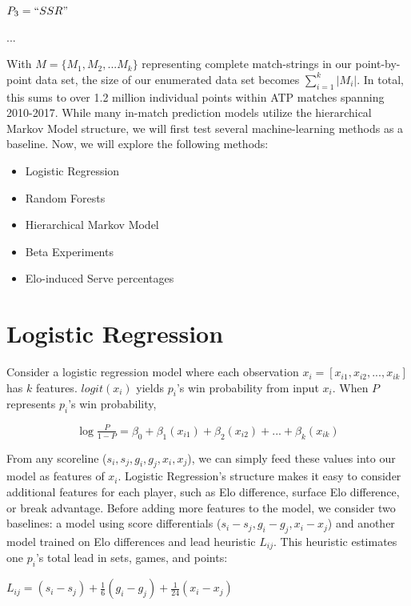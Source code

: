 \documentclass[chapterprefix=false]{report}
\begin{document}
$P_3 = ``SSR"$

...

With $M = \{M_1,M_2,...M_k\}$ representing complete match-strings in our point-by-point data set, the size of our enumerated data set becomes $\sum_{i=1}^k |M_i|$. In total, this sums to over 1.2 million individual points within ATP matches spanning 2010-2017. While many in-match prediction models utilize the hierarchical Markov Model structure, we will first test several machine-learning methods as a baseline. Now, we will explore the following methods:

\begin{itemize}
  \item Logistic Regression
  \item Random Forests
  \item Hierarchical Markov Model
  \item Beta Experiments 
  \item Elo-induced Serve percentages
\end{itemize}


\section{Logistic Regression}

Consider a logistic regression model where each observation $x_i = [x_{i1},x_{i2},...,x_{ik}]$ has $k$ features. $logit(x_i)$ yields $p_i$'s win probability from input $x_i$. When $P$ represents $p_i$'s win probability,

$$ \log{\tfrac{P}{1-P}} = \beta_0+\beta_1(x_{i1})+\beta_2(x_{i2})+...+\beta_k(x_{ik})$$


From any scoreline ($s_i,s_j,g_i,g_j,{x}_i,{x}_j$), we can simply feed these values into our model as features of $x_i$. Logistic Regression's structure makes it easy to consider additional features for each player, such as Elo difference, surface Elo difference, or break advantage. Before adding more features to the model, we consider two baselines: a model using score differentials ($s_i-s_j,g_i-g_j,{x}_i-{x}_j$) and another model trained on Elo differences and lead heuristic $L_{ij}$. This heuristic estimates one $p_i$'s total lead in sets, games, and points:

\begin{center}
$L_{ij} = (s_i-s_j) + \frac{1}{6}(g_i-g_j) + \frac{1}{24}(x_i-x_j)$
\end{center}
\end{document}
